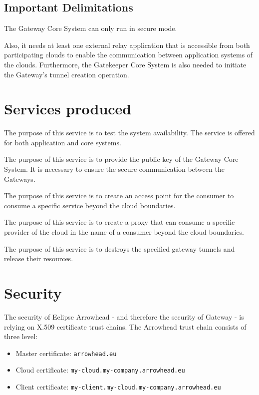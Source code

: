 \documentclass[a4paper]{arrowhead}
\begin{document}
\subsection{Important Delimitations}
\label{sec:delimitations}

The Gateway Core System can only run in secure mode.

Also, it needs at least one external relay application that is accessible from both participating clouds to enable the communication between application systems of the clouds. Furthermore, the Gatekeeper Core System is also needed to initiate the Gateway's tunnel creation operation.

\newpage

\section{Services produced}
\label{sec:services}

The purpose of this service is to test the system availability. The service is offered for both application and core systems. 

The purpose of this service is to provide the public key of the Gateway Core System. It is necessary to ensure the secure communication between the Gateways. 

The purpose of this service is to create an access point for the consumer to consume a specific service beyond the cloud boundaries. 

The purpose of this service is to create a proxy that can consume a specific provider of the cloud in the name of a consumer beyond the cloud boundaries.

The purpose of this service is to destroys the specified gateway tunnels and release their resources.

\newpage

\section{Security}
\label{sec:security}

The security of Eclipse Arrowhead - and therefore the security of Gateway - is relying on X.509 certificate trust chains. The Arrowhead trust chain consists of three level:
\begin{itemize}
    \item Master certificate: \texttt{arrowhead.eu}
    \item Cloud certificate: \texttt {my-cloud.my-company.arrowhead.eu}
    \item Client certificate: \texttt{my-client.my-cloud.my-company.arrowhead.eu}
\end{itemize}
\end{document}
